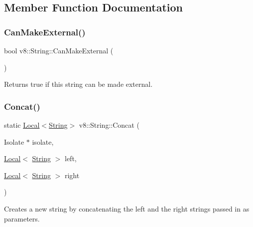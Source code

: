 \subsection{Member Function Documentation}
\mbox{\label{classv8_1_1String_a0fe076838af046506ffebbfadcde812a}} 
\subsubsection{\texorpdfstring{Can\+Make\+External()}{CanMakeExternal()}}
{\footnotesize\ttfamily bool v8\+::\+String\+::\+Can\+Make\+External (\begin{DoxyParamCaption}{ }\end{DoxyParamCaption})}

Returns true if this string can be made external. \mbox{\label{classv8_1_1String_a757cf6ba6e17164fc962c1051c068c58}} 
\subsubsection{\texorpdfstring{Concat()}{Concat()}}
{\footnotesize\ttfamily static \mbox{\hyperlink{classv8_1_1Local}{Local}}$<$\mbox{\hyperlink{classv8_1_1String}{String}}$>$ v8\+::\+String\+::\+Concat (\begin{DoxyParamCaption}\item[{Isolate $\ast$}]{isolate,  }\item[{\mbox{\hyperlink{classv8_1_1Local}{Local}}$<$ \mbox{\hyperlink{classv8_1_1String}{String}} $>$}]{left,  }\item[{\mbox{\hyperlink{classv8_1_1Local}{Local}}$<$ \mbox{\hyperlink{classv8_1_1String}{String}} $>$}]{right }\end{DoxyParamCaption})\hspace{0.3cm}{\ttfamily [static]}}

Creates a new string by concatenating the left and the right strings passed in as parameters. \mbox{\label{classv8_1_1String_a29b9bc5f71fba74af478e806b9d6a1d6}} 
